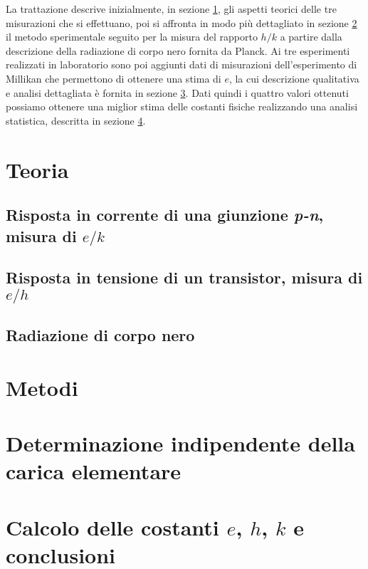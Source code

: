 \documentclass[a4paper, varvw, nofootinbib]{revtex4-2}
\begin{document}
La trattazione descrive inizialmente, in sezione \ref{sec:theory}, gli aspetti teorici delle tre misurazioni che si effettuano, poi si affronta in modo più dettagliato in sezione \ref{sec:black_body_methods} il metodo sperimentale seguito per la misura del rapporto $h/k$ a partire dalla descrizione della radiazione di corpo nero fornita da Planck. Ai tre esperimenti realizzati in laboratorio sono poi aggiunti dati di misurazioni dell'esperimento di Millikan che permettono di ottenere una stima di $e$, la cui descrizione qualitativa e analisi dettagliata è fornita in sezione \ref{sec:millikan}. Dati quindi i quattro valori ottenuti possiamo ottenere una miglior stima delle costanti fisiche realizzando una analisi statistica, descritta in sezione \ref{sec:combined_data}. 

\section{Teoria}\label{sec:theory}

\subsection{Risposta in corrente di una giunzione \emph{p-n}, misura di $e/k$}

\subsection{Risposta in tensione di un transistor, misura di $e/h$}

\subsection{Radiazione di corpo nero}

\section{Metodi}\label{sec:black_body_methods}

\section{Determinazione indipendente della carica elementare}\label{sec:millikan}

\section{Calcolo delle costanti $e$, $h$, $k$ e conclusioni}\label{sec:combined_data}


\end{document}
